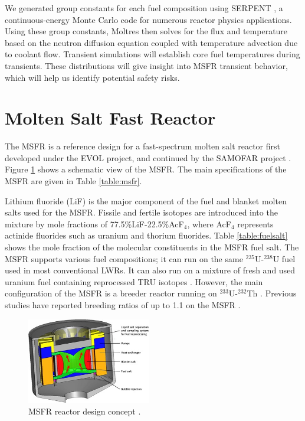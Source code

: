 \documentclass{anstrans}
\begin{document}
    We generated group constants for 
    each fuel composition using SERPENT \cite{leppanen_serpent_2015}, a 
    continuous-energy Monte Carlo code for numerous reactor physics 
    applications.
    Using these group constants, Moltres then 
    solves for the flux and temperature based on the neutron diffusion 
    equation coupled with temperature advection due to coolant flow. Transient 
    simulations will establish core fuel temperatures during transients.
    These distributions will give insight into MSFR transient behavior,
    which will help us identify potential safety risks.
    
\section{Molten Salt Fast Reactor}

	The \gls{MSFR} is a reference design for a fast-spectrum molten salt
	reactor
	first developed under the \gls{EVOL} project, and continued by the
	\gls{SAMOFAR} project \cite{serp_molten_2014}.
	Figure \ref{fig:msfr} shows a schematic view of the \gls{MSFR}. The main
	specifications of the \gls{MSFR} are given in Table \ref{table:msfr}.

	Lithium fluoride (LiF) is the major component of the fuel and blanket
	molten salts used for the \gls{MSFR}. Fissile and fertile isotopes are
	introduced
	into the mixture by mole fractions of 77.5\%LiF-22.5\%AcF$_4$, where
	AcF$_4$ represents actinide fluorides such as uranium and thorium
	fluorides. Table \ref{table:fuelsalt} shows the mole fraction of the
	molecular constituents in the \gls{MSFR} fuel salt.
	The \gls{MSFR} supports various fuel compositions; it can run on the same 
	$^{235}$U-$^{238}$U fuel used in most conventional LWRs. It can also run
	on a
	mixture of fresh and used uranium fuel containing reprocessed TRU
	isotopes \cite{fiorina_investigation_2013}. However, the main configuration
	of the \gls{MSFR} is a breeder reactor running on $^{233}$U-$^{232}$Th
	\cite{merle-lucotte_launching_2011}. Previous studies have reported
	breeding ratios of up to 1.1 on the \gls{MSFR} \cite{fiorina_molten_2013}. 

\begin{figure}[t] 
	\centering
	\includegraphics[width=0.48\textwidth]{./figures/MSFR}
	\caption{MSFR reactor design concept \cite{serp_molten_2014}.}
	\label{fig:msfr}
\end{figure} 
\end{document}
